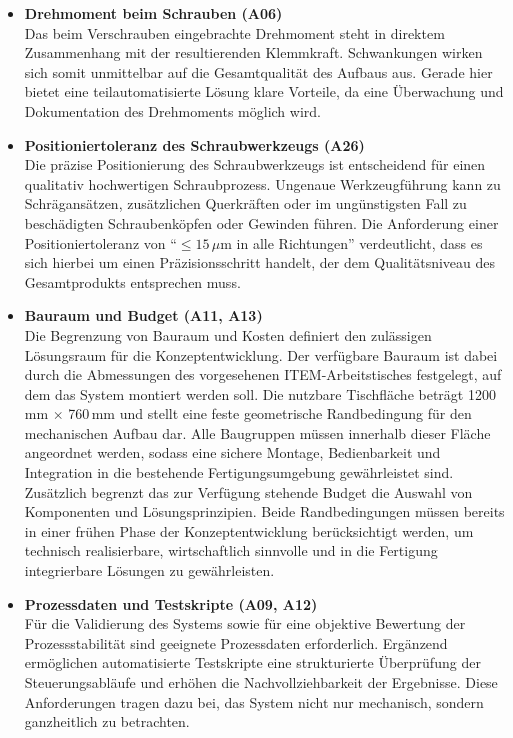 \begin{itemize}
    \item \textbf{Drehmoment beim Schrauben (A06)} \\
    Das beim Verschrauben eingebrachte Drehmoment steht in direktem Zusammenhang mit der resultierenden Klemmkraft. Schwankungen wirken sich somit unmittelbar auf die Gesamtqualität des Aufbaus aus. Gerade hier bietet eine teilautomatisierte Lösung klare Vorteile, da eine Überwachung und Dokumentation des Drehmoments möglich wird.

    \item \textbf{Positioniertoleranz des Schraubwerkzeugs (A26)} \\
    Die präzise Positionierung des Schraubwerkzeugs ist entscheidend für einen qualitativ hochwertigen Schraubprozess. Ungenaue Werkzeugführung kann zu Schrägansätzen, zusätzlichen Querkräften oder im ungünstigsten Fall zu beschädigten Schraubenköpfen oder Gewinden führen. Die Anforderung einer Positioniertoleranz von \enquote{$\leq 15\,\mu\mathrm{m}$ in alle Richtungen} verdeutlicht, dass es sich hierbei um einen Präzisionsschritt handelt, der dem Qualitätsniveau des Gesamtprodukts entsprechen muss.

    \item \textbf{Bauraum und Budget (A11, A13)} \\
    Die Begrenzung von Bauraum und Kosten definiert den zulässigen Lösungsraum für die Konzeptentwicklung. Der verfügbare Bauraum ist dabei durch die Abmessungen des vorgesehenen ITEM-Arbeitstisches festgelegt, auf dem das System montiert werden soll. Die nutzbare Tischfläche beträgt 1200\,mm $\times$ 760\,mm und stellt eine feste geometrische Randbedingung für den mechanischen Aufbau dar. Alle Baugruppen müssen innerhalb dieser Fläche angeordnet werden, sodass eine sichere Montage, Bedienbarkeit und Integration in die bestehende Fertigungsumgebung gewährleistet sind.\\Zusätzlich begrenzt das zur Verfügung stehende Budget die Auswahl von Komponenten und Lösungsprinzipien. Beide Randbedingungen müssen bereits in einer frühen Phase der Konzeptentwicklung berücksichtigt werden, um technisch realisierbare, wirtschaftlich sinnvolle und in die Fertigung integrierbare Lösungen zu gewährleisten.

    \item \textbf{Prozessdaten und Testskripte (A09, A12)} \\
    Für die Validierung des Systems sowie für eine objektive Bewertung der Prozessstabilität sind geeignete Prozessdaten erforderlich. Ergänzend ermöglichen automatisierte Testskripte eine strukturierte Überprüfung der Steuerungsabläufe und erhöhen die Nachvollziehbarkeit der Ergebnisse. Diese Anforderungen tragen dazu bei, das System nicht nur mechanisch, sondern ganzheitlich zu betrachten.


\end{itemize}
